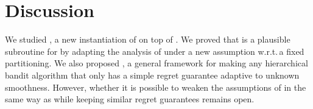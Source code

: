 \section{Discussion}\label{sec:gpo.discussion}

We studied \PCT, a new instantiation of \POO on top of \HCT. We proved that \HCT is a plausible subroutine for \POO by adapting the analysis of \HCT under a new assumption w.r.t.\,a fixed partitioning. We also proposed \GPO, a general framework for making any hierarchical bandit algorithm that only has a simple regret guarantee adaptive to unknown smoothness. However, whether it is possible to weaken the assumptions of \HOO in the same way as \HCT while keeping similar regret guarantees remains open.
